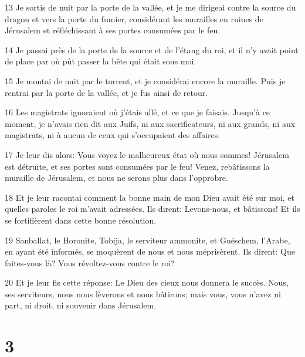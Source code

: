 \par 13 Je sortis de nuit par la porte de la vallée, et je me dirigeai contre la source du dragon et vers la porte du fumier, considérant les murailles en ruines de Jérusalem et réfléchissant à ses portes consumées par le feu.
\par 14 Je passai près de la porte de la source et de l'étang du roi, et il n'y avait point de place par où pût passer la bête qui était sous moi.
\par 15 Je montai de nuit par le torrent, et je considérai encore la muraille. Puis je rentrai par la porte de la vallée, et je fus ainsi de retour.
\par 16 Les magistrats ignoraient où j'étais allé, et ce que je faisais. Jusqu'à ce moment, je n'avais rien dit aux Juifs, ni aux sacrificateurs, ni aux grands, ni aux magistrats, ni à aucun de ceux qui s'occupaient des affaires.
\par 17 Je leur dis alors: Vous voyez le malheureux état où nous sommes! Jérusalem est détruite, et ses portes sont consumées par le feu! Venez, rebâtissons la muraille de Jérusalem, et nous ne serons plus dans l'opprobre.
\par 18 Et je leur racontai comment la bonne main de mon Dieu avait été sur moi, et quelles paroles le roi m'avait adressées. Ils dirent: Levons-nous, et bâtissons! Et ils se fortifièrent dans cette bonne résolution.
\par 19 Sanballat, le Horonite, Tobija, le serviteur ammonite, et Guéschem, l'Arabe, en ayant été informés, se moquèrent de nous et nous méprisèrent. Ils dirent: Que faites-vous là? Vous révoltez-vous contre le roi?
\par 20 Et je leur fis cette réponse: Le Dieu des cieux nous donnera le succès. Nous, ses serviteurs, nous nous lèverons et nous bâtirons; mais vous, vous n'avez ni part, ni droit, ni souvenir dans Jérusalem.

\chapter{3}


